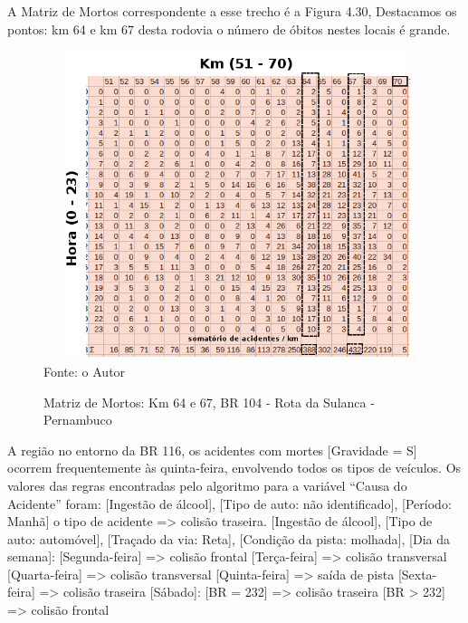 \vspace{7mm}

A Matriz de Mortos correspondente a esse trecho é a Figura 4.30, Destacamos os pontos: km 64 e km 67 desta rodovia o número de óbitos nestes locais é grande.

\begin{figure}[htbp!]
	\centering
	\caption{Matriz de Mortos: Km 64 e 67, BR 104 - Rota da Sulanca - Pernambuco}
	\label{fig:MatrizMortos2d-101}
	\includegraphics[width=120mm, height=90mm]{Figuras/Resultados/MM2d104}\\
	\tiny Fonte: o Autor
\end{figure}

\pagebreak


A região no entorno da BR 116, os acidentes com
mortes [Gravidade = S] ocorrem frequentemente às quinta-feira, envolvendo todos os tipos de veículos.
Os valores das regras encontradas pelo algoritmo para a
variável “Causa do Acidente” foram:
[Ingestão de álcool], [Tipo de auto: não identificado], [Período:
Manhã] o tipo de acidente => colisão traseira.
[Ingestão de álcool], [Tipo de auto: automóvel], [Traçado da
via: Reta], [Condição da pista: molhada], [Dia da semana]:
[Segunda-feira] => colisão frontal
[Terça-feira] => colisão transversal
[Quarta-feira] => colisão transversal
[Quinta-feira] => saída de pista
[Sexta-feira] => colisão traseira
[Sábado]: [BR = 232] => colisão traseira
	[BR > 232] => colisão frontal


